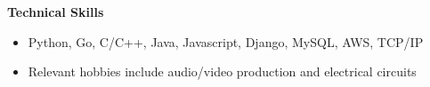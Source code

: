 \documentclass[letterpaper,11pt]{article}
\newcommand{\resitem}[1]{\item #1 \vspace{-2pt}}
\newcommand{\resheading}[1]{{\large \colorbox{mygrey}{\begin{minipage}{\textwidth}{\textbf{#1 \vphantom{p\^{E}}}}\end{minipage}}}}
\begin{document}
\resheading{Technical Skills}
\begin{itemize}
\resitem{Python, Go, C/C++, Java, Javascript, Django, MySQL, AWS, TCP/IP}
\resitem{Relevant hobbies include audio/video production and electrical circuits}
\end{itemize}

\end{document}
